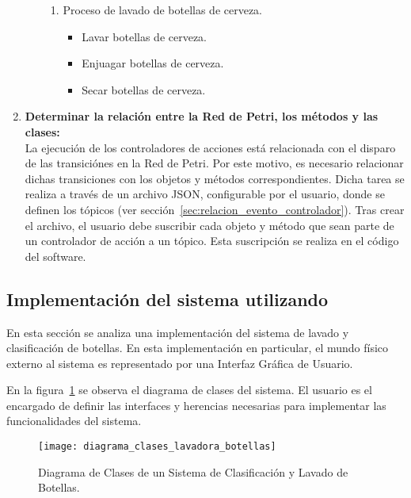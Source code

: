 \begin{enumerate}
\begin{itemize}
\begin{enumerate}[resume, label=\fbox{\arabic*}]
                    \item Proceso de lavado de botellas de cerveza.
                        \begin{itemize}
                          \item Lavar botellas de cerveza.
                          \item Enjuagar botellas de cerveza.
                          \item Secar botellas de cerveza.
                      \end{itemize}
                  \end{enumerate}
            \end{itemize}

\item \textbf{Determinar la relación entre la Red de Petri, los métodos y las clases:}\\
            La ejecución de los controladores de acciones está relacionada con el
            disparo de las transiciónes en la Red de Petri. Por este motivo, es
            necesario relacionar dichas transiciones con los objetos y métodos correspondientes.
            Dicha tarea se realiza a través de un archivo JSON, configurable por el
            usuario, donde se definen los tópicos (ver
            sección~\ref{sec:relacion_evento_controlador}). Tras crear el archivo, el
            usuario debe suscribir cada objeto y método que sean parte de un controlador
            de acción a un tópico. Esta suscripción se realiza en el código del software.
\end{enumerate}

\subsection {Implementación del sistema utilizando \nombreFramework}

En esta sección se analiza una implementación del sistema de
lavado y clasificación de botellas. En esta implementación en particular, el
mundo físico externo al sistema es representado por una Interfaz Gráfica de
Usuario. 

En la figura~\ref{fig:diagrama_clases_lavadora_botellas} se observa el diagrama
de clases del sistema. El usuario es el encargado de definir las interfaces y
herencias necesarias para implementar las funcionalidades del
sistema.
\begin{figure}[H]
    \centering
    \texttt{[image: diagrama\_clases\_lavadora\_botellas]}
    \caption{Diagrama de Clases de un Sistema de Clasificación y Lavado de
    Botellas.}
    \label{fig:diagrama_clases_lavadora_botellas}
\end{figure}

